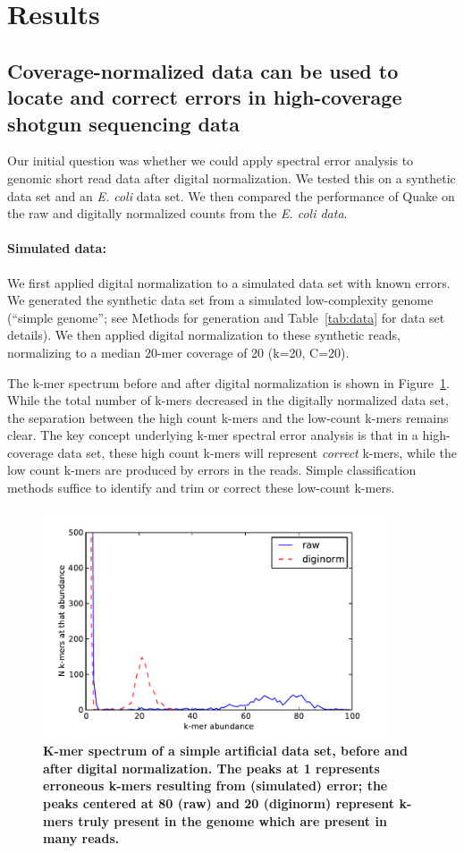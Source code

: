 \documentclass{article}
\begin{document}
\section{Results}

\subsection{Coverage-normalized data can be used to locate
and correct errors in high-coverage shotgun sequencing data}

Our initial question was whether we could apply spectral error analysis
to genomic short read data after digital normalization.  We
tested this on a synthetic data set and an {\em E. coli} data set.  We
then compared the performance of Quake on the raw and digitally
normalized counts from the {\em E. coli data}.

\paragraph{Simulated data:}
We first applied digital normalization to a simulated data set with
known errors.  We generated the synthetic data set from a simulated
low-complexity genome (``simple genome''; see Methods for generation
and Table~\ref{tab:data} for data set details). We then applied
digital normalization to these synthetic reads, normalizing to a
median 20-mer coverage of 20 (k=20, C=20).

The k-mer spectrum before and after digital normalization is shown in
Figure~\ref{fig:spectrum}.  While the total number of k-mers decreased
in the digitally normalized data set, the separation between the high
count k-mers and the low-count k-mers remains clear.  The key concept
underlying k-mer spectral error analysis is that in a high-coverage
data set, these high count k-mers will represent {\em correct} k-mers,
while the low count k-mers are produced by errors in the reads.
Simple classification methods suffice to identify and trim or correct
these low-count k-mers.

\begin{figure}[!ht]
 \centerline{\includegraphics[width=4in]{./figures/kmer-spectrum}}
\caption{\bf K-mer spectrum of a simple artificial data set, before and after digital normalization.  The peaks at 1 represents erroneous k-mers resulting
from (simulated) error; the peaks centered at 80 (raw) and 20 (diginorm)
represent k-mers truly present in the genome which are present in many reads.}
\label{fig:spectrum}
\end{figure}
\end{document}
